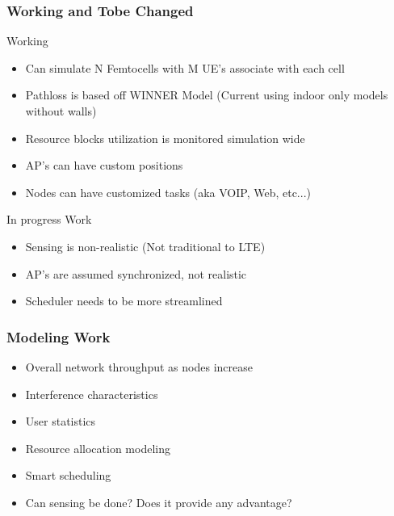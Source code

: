 \documentclass{beamer}
\begin{document}

\begin{frame}
\frametitle{Working and Tobe Changed}

\begin{block}{Working}
\begin{itemize}
  \item Can simulate N Femtocells with M UE's associate with each cell
  \item Pathloss is based off WINNER Model (Current using indoor only models without walls)
  \item Resource blocks utilization is monitored simulation wide
  \item AP's can have custom positions
  \item Nodes can have customized tasks (aka VOIP, Web, etc...)
\end{itemize}
\end{block}

\begin{block}{In progress Work}
  \begin{itemize}
    \item Sensing is non-realistic (Not traditional to LTE)
    \item AP's are assumed synchronized, not realistic
    \item Scheduler needs to be more streamlined
  \end{itemize}
\end{block}

\end{frame}


\begin{frame}
\frametitle{Modeling Work}
\begin{itemize}
  \item Overall network throughput as nodes increase
  \item Interference characteristics
  \item User statistics
  \item Resource allocation modeling
  \item Smart scheduling
  \item Can sensing be done? Does it provide any advantage?
\end{itemize}
\end{frame}

\end{document}
